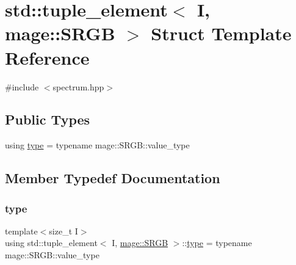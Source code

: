 \hypertarget{structstd_1_1tuple__element_3_01_i_00_01mage_1_1_s_r_g_b_01_4}{}\section{std\+:\+:tuple\+\_\+element$<$ I, mage\+:\+:S\+R\+GB $>$ Struct Template Reference}
\label{structstd_1_1tuple__element_3_01_i_00_01mage_1_1_s_r_g_b_01_4}


{\ttfamily \#include $<$spectrum.\+hpp$>$}

\subsection*{Public Types}
\begin{DoxyCompactItemize}
\item 
using \mbox{\hyperlink{structstd_1_1tuple__element_3_01_i_00_01mage_1_1_s_r_g_b_01_4_a372fdcfe6d022dd17a029e5bbe388748}{type}} = typename mage\+::\+S\+R\+G\+B\+::value\+\_\+type
\end{DoxyCompactItemize}


\subsection{Member Typedef Documentation}
\mbox{\label{structstd_1_1tuple__element_3_01_i_00_01mage_1_1_s_r_g_b_01_4_a372fdcfe6d022dd17a029e5bbe388748}} 
\subsubsection{\texorpdfstring{type}{type}}
{\footnotesize\ttfamily template$<$size\+\_\+t I$>$ \\
using std\+::tuple\+\_\+element$<$ I, \mbox{\hyperlink{structmage_1_1_s_r_g_b}{mage\+::\+S\+R\+GB}} $>$\+::\mbox{\hyperlink{structstd_1_1tuple__element_3_01_i_00_01mage_1_1_s_r_g_b_01_4_a372fdcfe6d022dd17a029e5bbe388748}{type}} =  typename mage\+::\+S\+R\+G\+B\+::value\+\_\+type}


